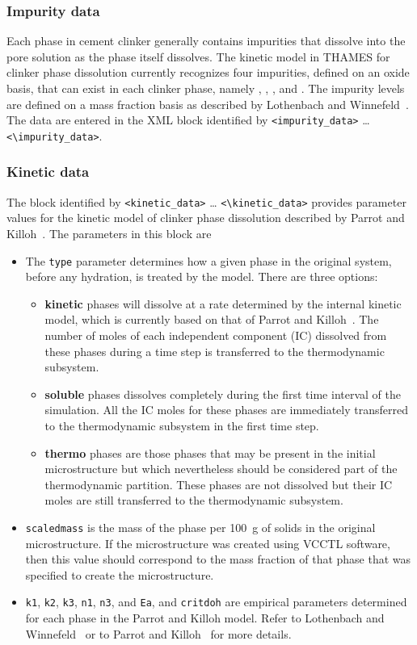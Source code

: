 \documentclass{article}
\begin{document}
\subsubsection{Impurity data}
Each phase in cement clinker generally contains impurities that dissolve into
the pore solution as the phase itself dissolves.  The kinetic model in THAMES
for clinker phase dissolution currently recognizes four impurities, defined
on an oxide basis, that can
exist in each clinker phase, namely , , , and
.  The impurity levels are defined on a mass fraction basis as
described by Lothenbach and Winnefeld~\cite{Lothenbach06}.  The data
are entered in the XML block identified by \verb!<impurity_data>! \ldots
\verb!<\impurity_data>!.

\subsubsection{Kinetic data}
The block identified by \verb!<kinetic_data>! \ldots
\verb!<\kinetic_data>! provides parameter values for the
kinetic model of clinker phase dissolution described by
Parrot and Killoh~\cite{Parrot84}.  The parameters in this block
are
\begin{itemize}
	\item The \texttt{type} parameter determines how a given phase in the
	original system, before any hydration, is treated by the model.  There are
	three options:
	\begin{itemize}
		\item \textbf{kinetic} phases will dissolve at a rate determined by
		the internal kinetic model, which is currently based on that of
	Parrot and Killoh~\cite{Parrot84}.  The number of moles of each
	independent component (IC) dissolved from these phases during a time step
	is transferred to the thermodynamic subsystem.
		\item \textbf{soluble} phases dissolves completely during the first
		time interval of the simulation.  All the IC moles for these phases
		are immediately transferred to the thermodynamic subsystem in the first time step.
		\item \textbf{thermo} phases are those phases that may be present in
		the initial microstructure but which nevertheless should be considered
		part of the thermodynamic partition.  These phases are not dissolved
		but their IC moles are still transferred to the thermodynamic
		subsystem.
	\end{itemize}
	\item \texttt{scaledmass} is the mass of the phase per \SI{100}{\gram}
	of solids in the original microstructure.  If the microstructure was
	created using VCCTL software, then this value should correspond to the
	mass fraction of that phase that was specified to create the microstructure.
	\item \texttt{k1}, \texttt{k2}, \texttt{k3}, \texttt{n1}, \texttt{n3}, and
	\texttt{Ea}, and \texttt{critdoh} are empirical parameters determined for
	each phase in the Parrot and Killoh model.  Refer to Lothenbach and
	Winnefeld~\cite{Lothenbach06} or to Parrot and Killoh~\cite{Parrot84} for
	more details.
\end{itemize}
\end{document}
